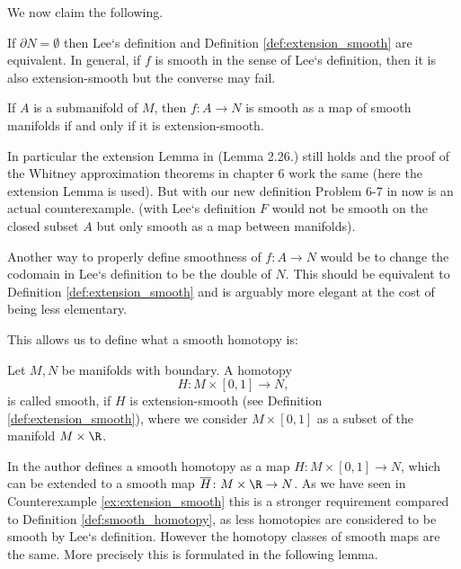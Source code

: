 We now claim the following.

\begin{lemma}
    \label{lem:smoothness_arbitrary_subsets_1}
    If $\partial N = \emptyset$ then Lee`s definition and Definition \ref{def:extension_smooth} are equivalent. In general, if $f$ is smooth in the sense of Lee`s definition, then it is also extension-smooth but the converse may fail.
\end{lemma}

\begin{lemma}
    If $A$ is a submanifold of $M$, then $f \colon A \to N$ is smooth as a map of smooth manifolds if and only if it is extension-smooth.
\end{lemma}

In particular the extension Lemma in \cite{lee2011smooth} (Lemma 2.26.) still holds and the proof of the Whitney approximation theorems in chapter 6 work the same (here the extension Lemma is used). But with our new definition Problem 6-7 in \cite{lee2011smooth} now is an actual counterexample. (with Lee`s definition $F$ would not be smooth on the closed subset $A$ but only smooth as a map between manifolds).

Another way to properly define smoothness of $f \colon A \to N$ would be to change the codomain in Lee`s definition to be the double of $N$. This should be equivalent to Definition \ref{def:extension_smooth} and is arguably more elegant at the cost of being less elementary. 


\noindent This allows us to define what a smooth homotopy is:
\begin{definition}
    \label{def:smooth_homotopy}
    Let $M,N$ be manifolds with boundary. A homotopy
    \[
        H \colon M \times [0,1] \to N,
    \]
    is called smooth, if $H$ is extension-smooth (see Definition \ref{def:extension_smooth}), where we consider $M \times [0,1]$ as a subset of the manifold $M \times \R$.
\end{definition} 

In \cite{lee2011smooth} the author defines a smooth homotopy as a map $H \colon M \times [0,1] \to N$, which can be extended to a smooth map $\overline{H} \colon M \times \R \to N$.
As we have seen in Counterexample \ref{ex:extension_smooth} this is a stronger requirement compared to Definition \ref{def:smooth_homotopy}, as less homotopies are considered to be smooth by Lee`s definition. However the homotopy classes of smooth maps are the same. More precisely this is formulated in the following lemma.

